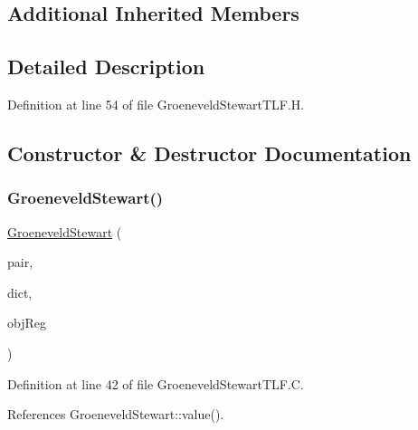 \subsection*{Additional Inherited Members}


\subsection{Detailed Description}


Definition at line 54 of file Groeneveld\+Stewart\+T\+L\+F.\+H.



\subsection{Constructor \& Destructor Documentation}
\mbox{\label{classFoam_1_1LeidenFrostTemperatureModels_1_1GroeneveldStewart_a02fa937ad477dc3ed4fb20e417cf607e}} 
\subsubsection{\texorpdfstring{Groeneveld\+Stewart()}{GroeneveldStewart()}}
{\footnotesize\ttfamily \hyperlink{classFoam_1_1LeidenFrostTemperatureModels_1_1GroeneveldStewart}{Groeneveld\+Stewart} (\begin{DoxyParamCaption}\item[{const \hyperlink{classFoam_1_1FSPair}{F\+S\+Pair} \&}]{pair,  }\item[{const dictionary \&}]{dict,  }\item[{const object\+Registry \&}]{obj\+Reg }\end{DoxyParamCaption})}



Definition at line 42 of file Groeneveld\+Stewart\+T\+L\+F.\+C.



References Groeneveld\+Stewart\+::value().

